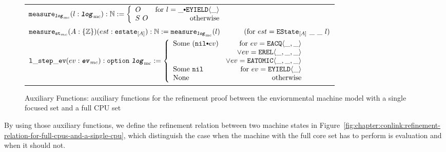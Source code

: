 \begin{figure}
\noindent{}
\begin{center}
\begin{tabular}{l}
$
   \mcmeasurekwd (l : \mclog)  : \nattype :=
     \left\{\begin{array}{lr}
        O & \text{for }  l = \listconsoppo{\yieldev{\_}}{\_} \\
        S \ O & \text{otherwise}\\
        \end{array} \right.$ \\
$ \mcstatemeasurekwd (A : \set{\ztype}) (est : \envstatekwd_{[A]}) : \nattype := \mcmeasurenoeq{l} \ \ \ \ \ \ \ \ \ \ (\text{for } est = \envstate{A}{\_}{\_}{l}) $\\
$ \localstepevkwd (ev : \mcevent) : \optiondef\ \mclog := 
     \left\{\begin{array}{lr}
        \mathrm{Some} \ (\listconsoppo{ev}{\nulllist}) & \text{for }  ev = \acqev{\_}{\_} \\
                                        & \vee  ev= \relev{\_}{\_}{\_} \\
                                        & \vee ev= \atomicev{\_}{\_}{\_} \\
        \mathrm{Some} \ \nulllist & \text{for }  ev = \yieldev{\_} \\
	   \mathrm{None} & \text{otherwise}\\
        \end{array} \right. $ \\
\end{tabular}        
\end{center}
%  
%
\caption{Auxiliary Functions:  auxiliary functions for the refinement proof between
the enviornmental machine model with a single focused set and a full CPU set}
\label{fig:chapter:conlink:auxiliary-function-for-full-cpus-and-a-single-cpu}
\end{figure}


By using those auxiliary functions, we define the refinement relation between two machine states in Figure~\ref{fig:chapter:conlink:refinement-relation-for-full-cpus-and-a-single-cpu}, 
which distinguish the case when the machine with the full core set has to perform is evaluation and 
when it should not. 

